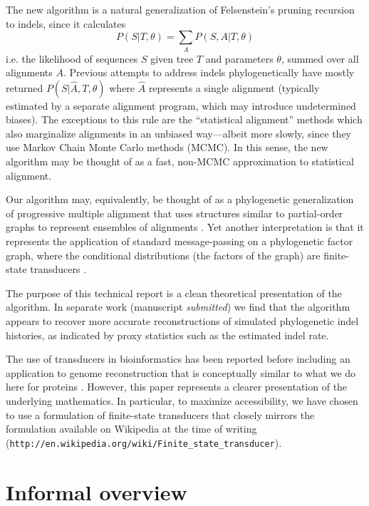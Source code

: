 \documentclass{article}
\begin{document}
The new algorithm is a natural generalization of Felsenstein's pruning recursion to indels,
since it calculates
\[
P(S|T,\theta) = \sum_A P(S,A|T,\theta)
\]
i.e. the likelihood of sequences $S$ given tree $T$ and parameters $\theta$, summed over all alignments $A$.
Previous attempts to address indels phylogenetically have mostly returned $P(S|\hat{A},T,\theta)$ where $\hat{A}$ represents a single alignment
(typically estimated by a separate alignment program, which may introduce undetermined biases).
The exceptions to this rule are the ``statistical alignment'' methods \cite{HeinEtal2000,HolmesBruno2001,SuchardRedelings2006}
which also marginalize alignments in an unbiased way---albeit more slowly, since they use Markov Chain Monte Carlo methods (MCMC).
In this sense, the new algorithm may be thought of as a fast, non-MCMC approximation to statistical alignment.

Our algorithm may, equivalently, be thought of as a phylogenetic generalization of progressive multiple alignment \cite{HigginsSharp89}
that uses structures similar to partial-order graphs to represent ensembles of alignments \cite{LeeGrassoSharlow2002}.
Yet another interpretation is that it represents the application of standard message-passing on a phylogenetic factor graph,
where the conditional distributions (the factors of the graph) are finite-state transducers \cite{KschischangEtAl98}.

The purpose of this technical report is a clean theoretical presentation of the algorithm.
In separate work (manuscript {\em submitted}) we find that the algorithm appears to recover more accurate reconstructions of simulated phylogenetic indel histories,
as indicated by proxy statistics such as the estimated indel rate.

The use of transducers in bioinformatics has been reported before \cite{Holmes2003,BradleyHolmes2007,SatijaEtAl2008,PatenEtAl2008}
including an application to genome reconstruction that is conceptually similar to what we do here for proteins \cite{PatenEtAl2008}.
However, this paper represents a clearer presentation of the underlying mathematics.
In particular, to maximize accessibility, we have chosen to use a formulation of finite-state transducers
that closely mirrors the formulation available on Wikipedia at the time of writing ({\tt http://en.wikipedia.org/wiki/Finite\_state\_transducer}).



\section{Informal overview}
\end{document}
